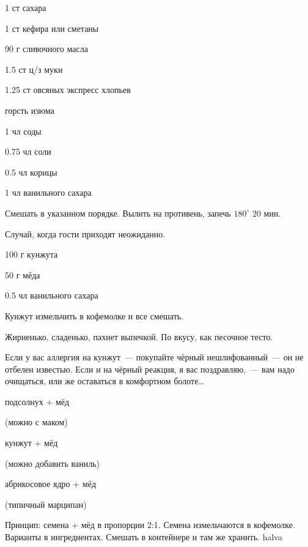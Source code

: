 

{
\item 1 ст сахара
\item 1 ст кефира или сметаны
\item 90 г сливочного масла
\item 1.5 ст ц/з муки
\item 1.25 ст овсяных экспресс хлопьев %
\item горсть изюма
}{
\item 1 чл соды
\item 0.75 чл соли
\item 0.5 чл корицы
\item 1 чл ванильного сахара
}{
Смешать в указанном порядке. Вылить на противень, запечь $180^{\circ}$ 20 мин.
}{
\begin{advice}
\item Случай, когда гости приходят неожиданно.
\end{advice}}{}



{\label{cookies}
\item 100 г кунжута 
\item 50 г мёда
}{
\item 0.5 чл ванильного сахара
}{
Кунжут измельчить в кофемолке и все смешать.
}{
\begin{advice}
    \item  Жирненько, сладенько, пахнет выпечкой. По вкусу, как песочное тесто.
\item Если у вас аллергия на кунжут~--- покупайте чёрный нешлифованный~— он не отбелен известью. Если и на чёрный реакция, я вас поздравляю,~— вам надо очищаться, или же оставаться в комфортном болоте\ldots

\end{advice}}{}



{


\item подсолнух + мёд

    (можно с маком)
\item кунжут + мёд 

    (можно добавить ваниль)
\item абрикосовое ядро + мёд 

    (типичный марципан)

}{%
\item[]
}{
Принцип: семена + мёд в пропорции 2:1. Семена измельчаются в кофемолке. Варианты в ингредиентах.
Смешать в контейнере и там же хранить.
}{}{halva}




